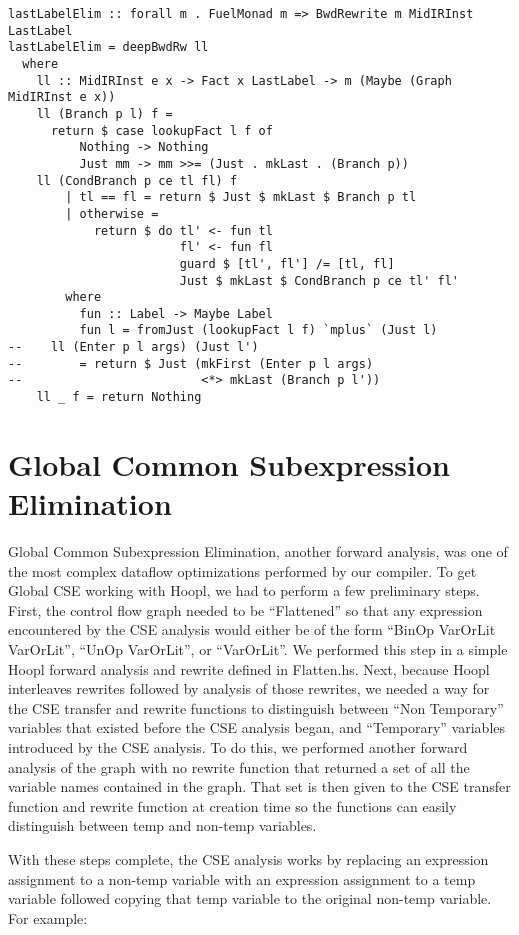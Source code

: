 \documentclass[11pt]{article}
\begin{document}
\begin{verbatim}
lastLabelElim :: forall m . FuelMonad m => BwdRewrite m MidIRInst LastLabel
lastLabelElim = deepBwdRw ll
  where
    ll :: MidIRInst e x -> Fact x LastLabel -> m (Maybe (Graph MidIRInst e x))
    ll (Branch p l) f = 
      return $ case lookupFact l f of
          Nothing -> Nothing
          Just mm -> mm >>= (Just . mkLast . (Branch p))
    ll (CondBranch p ce tl fl) f
        | tl == fl = return $ Just $ mkLast $ Branch p tl
        | otherwise =
            return $ do tl' <- fun tl
                        fl' <- fun fl
                        guard $ [tl', fl'] /= [tl, fl]
                        Just $ mkLast $ CondBranch p ce tl' fl'
        where
          fun :: Label -> Maybe Label
          fun l = fromJust (lookupFact l f) `mplus` (Just l)
--    ll (Enter p l args) (Just l')
--        = return $ Just (mkFirst (Enter p l args)
--                         <*> mkLast (Branch p l'))
    ll _ f = return Nothing
\end{verbatim}

\section {Global Common Subexpression Elimination} 
\label{sec:cse}

Global Common Subexpression Elimination, another forward analysis, was one of the most complex dataflow optimizations performed by our compiler. To get Global CSE working with Hoopl, we had to perform a few preliminary steps. First, the control flow graph needed to be ``Flattened'' so that any expression encountered by the CSE analysis would either be of the form ``BinOp VarOrLit VarOrLit'', ``UnOp VarOrLit'', or ``VarOrLit''. We performed this step in a simple Hoopl forward analysis and rewrite defined in Flatten.hs. Next, because Hoopl interleaves rewrites followed by analysis of those rewrites, we needed a way for the CSE transfer and rewrite functions to distinguish between ``Non Temporary'' variables that existed before the CSE analysis began, and ``Temporary'' variables introduced by the CSE analysis. To do this, we performed another forward analysis of the graph with no rewrite function that returned a set of all the variable names contained in the graph. That set is then given to the CSE transfer function and rewrite function at creation time so the functions can easily distinguish between temp and non-temp variables. 

With these steps complete, the CSE analysis works by replacing an expression assignment to a non-temp variable with an expression assignment to a temp variable followed copying that temp variable to the original non-temp variable. For example:\\
\end{document}
